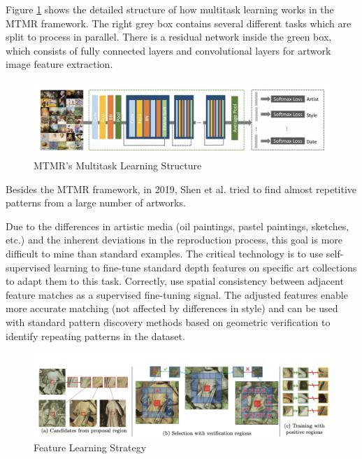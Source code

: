 Figure \ref{fig:mtmrmulti} shows the detailed structure of how multitask learning works in the MTMR framework. The right grey box contains several different tasks which are split to process in parallel. There is a residual network inside the green box, which consists of fully connected layers and convolutional layers for artwork image feature extraction.


\begin{figure}[h!]
\centering
\includegraphics[width=\textwidth]{MTMRmultitask.pdf}
\caption{MTMR's Multitask Learning Structure \cite{parttowhole}}
\label{fig:mtmrmulti}
\end{figure}

Besides the MTMR framework, in 2019, Shen et al. \cite{shen2019discovering} tried to find almost repetitive patterns from a large number of artworks. 

Due to the differences in artistic media (oil paintings, pastel paintings, sketches, etc.) and the inherent deviations in the reproduction process, this goal is more difficult to mine than standard examples. The critical technology is to use self-supervised learning to fine-tune standard depth features on specific art collections to adapt them to this task. Correctly, use spatial consistency between adjacent feature matches as a supervised fine-tuning signal. The adjusted features enable more accurate matching (not affected by differences in style) and can be used with standard pattern discovery methods based on geometric verification to identify repeating patterns in the dataset.

\begin{figure}[h!]
\centering
\includegraphics[width=\textwidth]{featurelearningartwork.pdf}
\caption{Feature Learning Strategy \cite{shen2019discovering}}
\label{fig:featurelearning}
\end{figure}

